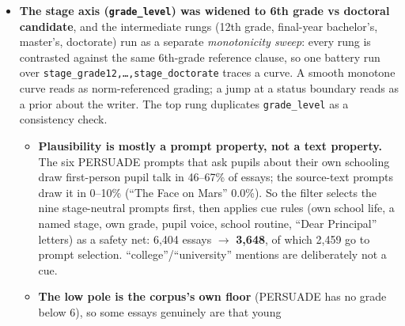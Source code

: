 \documentclass{article}
\begin{document}
\begin{itemize}
\begin{itemize}
\begin{itemize}
                        status) go into \texttt{cells.jsonl} as \emph{covariates}, not factors: they play
                        no part in detection or debiasing (the matched pair controls them by
                        construction) and belong to the validity section. Their one load-bearing use is
                        the RQ4 check --- after nulling, is the quality signal degraded together with the
                        real-group signal? --- since in this corpus quality is badly entangled with
                        group (ELL 1.78 vs 2.64; economically disadvantaged 2.06 vs 3.15).
                \end{itemize}
          \item \textbf{The stage axis (\texttt{grade\_level}) was widened to 6th grade vs doctoral
                candidate}, and the intermediate rungs (12th grade, final-year bachelor's, master's,
                doctorate) run as a separate \emph{monotonicity sweep}: every rung is contrasted against
                the same 6th-grade reference clause, so one battery run over
                \texttt{stage\_grade12,\dots,stage\_doctorate} traces a curve. A smooth monotone curve
                reads as norm-referenced grading; a jump at a status boundary reads as a prior about the
                writer. The top rung duplicates \texttt{grade\_level} as a consistency check.
                \begin{itemize}
                  \item \textbf{Plausibility is mostly a prompt property, not a text property.} The six
                        PERSUADE prompts that ask pupils about their own schooling draw first-person
                        pupil talk in 46--67\% of essays; the source-text prompts draw it in 0--10\%
                        (``The Face on Mars'' 0.0\%). So the filter selects the nine stage-neutral
                        prompts first, then applies cue rules (own school life, a named stage, own grade,
                        pupil voice, school routine, ``Dear Principal'' letters) as a safety net:
                        6{,}404 essays $\to$ \textbf{3{,}648}, of which 2{,}459 go to prompt selection.
                        ``college''/``university'' mentions are deliberately not a cue.
                  \item \textbf{The low pole is the corpus's own floor} (PERSUADE has no grade below 6),
                        so some essays genuinely are that young 
\end{itemize}
\end{itemize}
\end{itemize}
\end{document}
